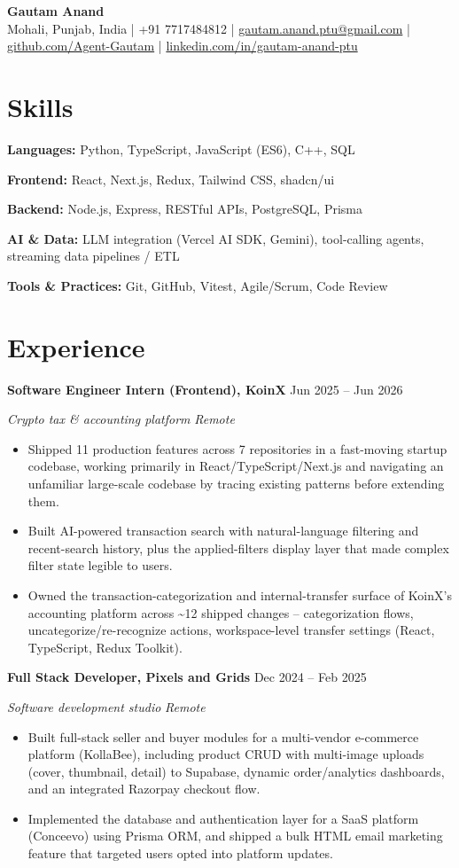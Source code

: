 \documentclass[letterpaper,10.5pt]{article}
\newcommand{\ResumeHeader}[2]{%
  \begin{center}
    {\Huge\bfseries #1}\\[5pt]
    {\small #2}%
  \end{center}\vspace{-6pt}}
\newcommand{\Entry}[4]{%
  \textbf{#1} \hfill {\small #2}\par
  \textit{\small #3} \hfill {\small\textit{#4}}\par\vspace{-1pt}}
\newenvironment{Bullets}
  {\begin{itemize}[leftmargin=1.15em,itemsep=1pt,parsep=0pt,topsep=2pt]\small}
  {\end{itemize}\vspace{2pt}}
\newcommand{\SkillRow}[2]{{\small \textbf{#1:} #2}\par\vspace{1.5pt}}
\begin{document}
\ResumeHeader{Gautam Anand}
  {Mohali, Punjab, India \;|\; +91 7717484812 \;|\;
   \href{mailto:gautam.anand.ptu@gmail.com}{gautam.anand.ptu@gmail.com} \;|\;
   \href{https://github.com/Agent-Gautam}{github.com/Agent-Gautam} \;|\;
   \href{https://www.linkedin.com/in/gautam-anand-ptu}{linkedin.com/in/gautam-anand-ptu}}

\section{Skills}
\SkillRow{Languages}{Python, TypeScript, JavaScript (ES6), C++, SQL}
\SkillRow{Frontend}{React, Next.js, Redux, Tailwind CSS, shadcn/ui}
\SkillRow{Backend}{Node.js, Express, RESTful APIs, PostgreSQL, Prisma}
\SkillRow{AI \& Data}{LLM integration (Vercel AI SDK, Gemini), tool-calling agents, streaming data pipelines / ETL}
\SkillRow{Tools \& Practices}{Git, GitHub, Vitest, Agile/Scrum, Code Review}

\section{Experience}
\Entry{Software Engineer Intern (Frontend), KoinX}{Jun 2025 -- Jun 2026}{Crypto tax \& accounting platform}{Remote}
\begin{Bullets}
  \item Shipped 11 production features across 7 repositories in a fast-moving startup codebase, working primarily in React/TypeScript/Next.js and navigating an unfamiliar large-scale codebase by tracing existing patterns before extending them.
  \item Built AI-powered transaction search with natural-language filtering and recent-search history, plus the applied-filters display layer that made complex filter state legible to users.
  \item Owned the transaction-categorization and internal-transfer surface of KoinX's accounting platform across \textasciitilde{}12 shipped changes -- categorization flows, uncategorize/re-recognize actions, workspace-level transfer settings (React, TypeScript, Redux Toolkit).
\end{Bullets}

\Entry{Full Stack Developer, Pixels and Grids}{Dec 2024 -- Feb 2025}{Software development studio}{Remote}
\begin{Bullets}
  \item Built full-stack seller and buyer modules for a multi-vendor e-commerce platform (KollaBee), including product CRUD with multi-image uploads (cover, thumbnail, detail) to Supabase, dynamic order/analytics dashboards, and an integrated Razorpay checkout flow.
  \item Implemented the database and authentication layer for a SaaS platform (Conceevo) using Prisma ORM, and shipped a bulk HTML email marketing feature that targeted users opted into platform updates.
\end{Bullets}
\end{document}
